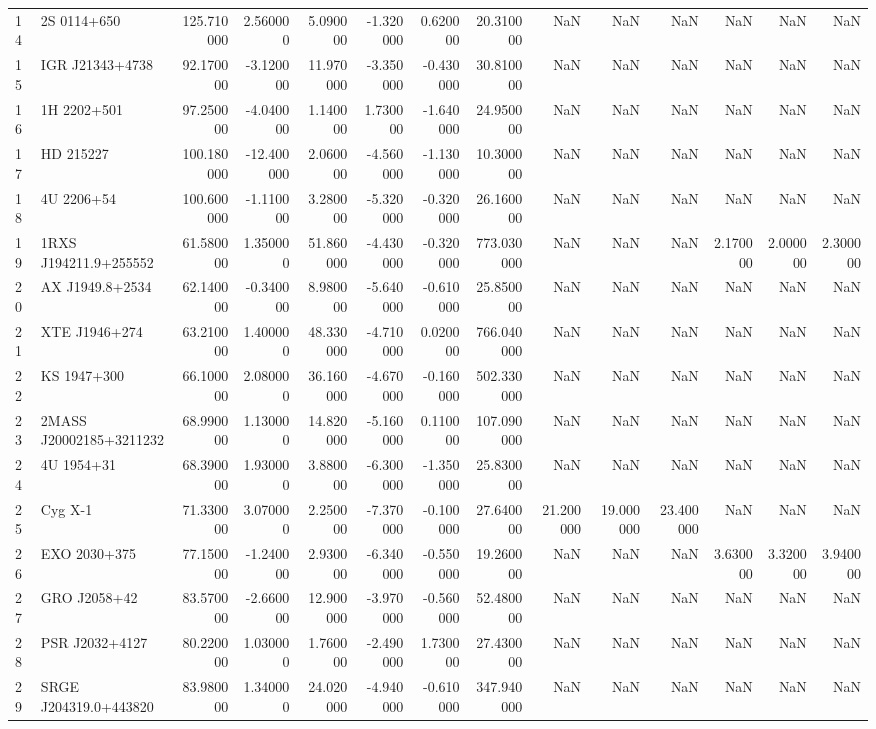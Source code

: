 \begin{tabular}{llrrrrrrrrrrrr}
14 & 2S 0114+650 & 125.710000 & 2.560000 & 5.090000 & -1.320000 & 0.620000 & 20.310000 & NaN & NaN & NaN & NaN & NaN & NaN \\
15 & IGR J21343+4738 & 92.170000 & -3.120000 & 11.970000 & -3.350000 & -0.430000 & 30.810000 & NaN & NaN & NaN & NaN & NaN & NaN \\
16 & 1H 2202+501 & 97.250000 & -4.040000 & 1.140000 & 1.730000 & -1.640000 & 24.950000 & NaN & NaN & NaN & NaN & NaN & NaN \\
17 & HD 215227 & 100.180000 & -12.400000 & 2.060000 & -4.560000 & -1.130000 & 10.300000 & NaN & NaN & NaN & NaN & NaN & NaN \\
18 & 4U 2206+54 & 100.600000 & -1.110000 & 3.280000 & -5.320000 & -0.320000 & 26.160000 & NaN & NaN & NaN & NaN & NaN & NaN \\
19 & 1RXS J194211.9+255552 & 61.580000 & 1.350000 & 51.860000 & -4.430000 & -0.320000 & 773.030000 & NaN & NaN & NaN & 2.170000 & 2.000000 & 2.300000 \\
20 & AX J1949.8+2534 & 62.140000 & -0.340000 & 8.980000 & -5.640000 & -0.610000 & 25.850000 & NaN & NaN & NaN & NaN & NaN & NaN \\
21 & XTE J1946+274 & 63.210000 & 1.400000 & 48.330000 & -4.710000 & 0.020000 & 766.040000 & NaN & NaN & NaN & NaN & NaN & NaN \\
22 & KS 1947+300 & 66.100000 & 2.080000 & 36.160000 & -4.670000 & -0.160000 & 502.330000 & NaN & NaN & NaN & NaN & NaN & NaN \\
23 & 2MASS J20002185+3211232 & 68.990000 & 1.130000 & 14.820000 & -5.160000 & 0.110000 & 107.090000 & NaN & NaN & NaN & NaN & NaN & NaN \\
24 & 4U 1954+31 & 68.390000 & 1.930000 & 3.880000 & -6.300000 & -1.350000 & 25.830000 & NaN & NaN & NaN & NaN & NaN & NaN \\
25 & Cyg X-1 & 71.330000 & 3.070000 & 2.250000 & -7.370000 & -0.100000 & 27.640000 & 21.200000 & 19.000000 & 23.400000 & NaN & NaN & NaN \\
26 & EXO 2030+375 & 77.150000 & -1.240000 & 2.930000 & -6.340000 & -0.550000 & 19.260000 & NaN & NaN & NaN & 3.630000 & 3.320000 & 3.940000 \\
27 & GRO J2058+42 & 83.570000 & -2.660000 & 12.900000 & -3.970000 & -0.560000 & 52.480000 & NaN & NaN & NaN & NaN & NaN & NaN \\
28 & PSR J2032+4127 & 80.220000 & 1.030000 & 1.760000 & -2.490000 & 1.730000 & 27.430000 & NaN & NaN & NaN & NaN & NaN & NaN \\
29 & SRGE J204319.0+443820 & 83.980000 & 1.340000 & 24.020000 & -4.940000 & -0.610000 & 347.940000 & NaN & NaN & NaN & NaN & NaN & NaN \\

\end{tabular}
